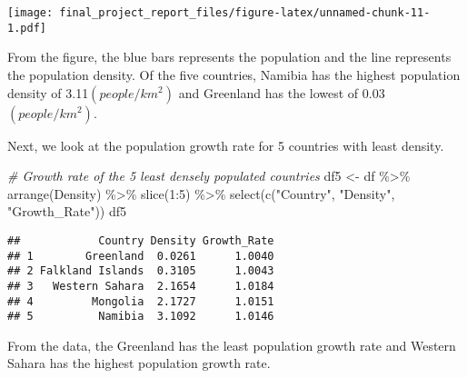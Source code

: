 \documentclass[
]{article}
\newenvironment{Shaded}{\begin{snugshade}}{\end{snugshade}}
\newcommand{\CommentTok}[1]{\textcolor[rgb]{0.56,0.35,0.01}{\textit{#1}}}
\newcommand{\DecValTok}[1]{\textcolor[rgb]{0.00,0.00,0.81}{#1}}
\newcommand{\FunctionTok}[1]{\textcolor[rgb]{0.00,0.00,0.00}{#1}}
\newcommand{\NormalTok}[1]{#1}
\newcommand{\OtherTok}[1]{\textcolor[rgb]{0.56,0.35,0.01}{#1}}
\newcommand{\SpecialCharTok}[1]{\textcolor[rgb]{0.00,0.00,0.00}{#1}}
\newcommand{\StringTok}[1]{\textcolor[rgb]{0.31,0.60,0.02}{#1}}
\begin{document}
\texttt{[image: final\_project\_report\_files/figure-latex/unnamed-chunk-11-1.pdf]}

From the figure, the blue bars represents the population and the line
represents the population density. Of the five countries, Namibia has
the highest population density of 3.11\((people/km^2)\) and Greenland
has the lowest of 0.03\((people/km^2)\).

Next, we look at the population growth rate for 5 countries with least
density.

\begin{Shaded}
\begin{Highlighting}[]
\CommentTok{\# Growth rate of the 5 least densely populated countries}
\NormalTok{df5 }\OtherTok{\textless{}{-}}\NormalTok{ df }\SpecialCharTok{\%\textgreater{}\%} \FunctionTok{arrange}\NormalTok{(Density) }\SpecialCharTok{\%\textgreater{}\%} \FunctionTok{slice}\NormalTok{(}\DecValTok{1}\SpecialCharTok{:}\DecValTok{5}\NormalTok{) }\SpecialCharTok{\%\textgreater{}\%} 
  \FunctionTok{select}\NormalTok{(}\FunctionTok{c}\NormalTok{(}\StringTok{"Country"}\NormalTok{, }\StringTok{"Density"}\NormalTok{, }\StringTok{"Growth\_Rate"}\NormalTok{))}
\NormalTok{df5}
\end{Highlighting}
\end{Shaded}

\begin{verbatim}
##            Country Density Growth_Rate
## 1        Greenland  0.0261      1.0040
## 2 Falkland Islands  0.3105      1.0043
## 3   Western Sahara  2.1654      1.0184
## 4         Mongolia  2.1727      1.0151
## 5          Namibia  3.1092      1.0146
\end{verbatim}

From the data, the Greenland has the least population growth rate and
Western Sahara has the highest population growth rate.
\end{document}
